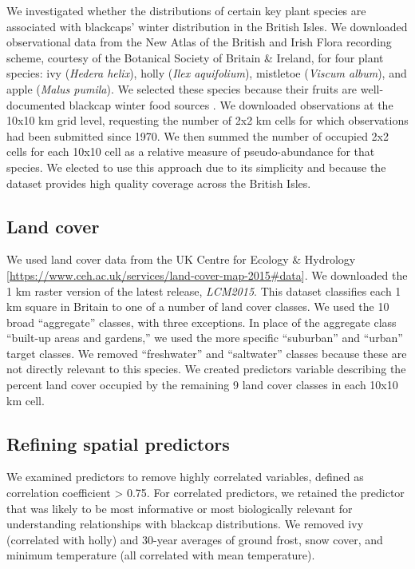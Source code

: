 \documentclass[a4paper, twoside]{templates/ociamthesis}
\begin{document}
We investigated whether the distributions of certain key plant species are associated with blackcaps' winter distribution in the British Isles. We downloaded observational data from the New Atlas of the British and Irish Flora recording scheme, courtesy of the Botanical Society of Britain \& Ireland, for four plant species:
ivy (\emph{Hedera helix}),
holly (\emph{Ilex aquifolium}),
mistletoe (\emph{Viscum album}),
and apple (\emph{Malus pumila}). We selected these species because their fruits are well-documented blackcap winter food sources \autocite{snowBirdsBerries2010,hardyWinterFoodsBlackcaps1978,leachWinteringBlackcapsBritain1981}.
We downloaded observations at the 10x10 km grid level, requesting the number of 2x2 km cells for which observations had been submitted since 1970. We then summed the number of occupied 2x2 cells for each 10x10 cell as a relative measure of pseudo-abundance for that species. We elected to use this approach due to its simplicity and because the dataset provides high quality coverage across the British Isles.

\hypertarget{land-cover}{%
\subsection{Land cover}\label{land-cover}}

We used land cover data from the UK Centre for Ecology \& Hydrology {[}\url{https://www.ceh.ac.uk/services/land-cover-map-2015\#data}{]}. We downloaded the 1 km raster version of the latest release, \emph{LCM2015}. This dataset classifies each 1 km square in Britain to one of a number of land cover classes. We used the 10 broad ``aggregate'' classes, with three exceptions. In place of the aggregate class ``built-up areas and gardens,'' we used the more specific ``suburban'' and ``urban'' target classes. We removed ``freshwater'' and ``saltwater'' classes because these are not directly relevant to this species. We created predictors variable describing the percent land cover occupied by the remaining 9 land cover classes in each 10x10 km cell.

\hypertarget{refining-spatial-predictors}{%
\subsection{Refining spatial predictors}\label{refining-spatial-predictors}}

We examined predictors to remove highly correlated variables, defined as correlation coefficient \textgreater{} 0.75. For correlated predictors, we retained the predictor that was likely to be most informative or most biologically relevant for understanding relationships with blackcap distributions. We removed ivy (correlated with holly) and 30-year averages of ground frost, snow cover, and minimum temperature (all correlated with mean temperature).
\end{document}
